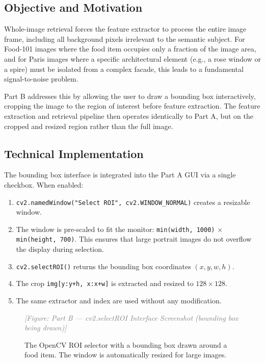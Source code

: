 \documentclass[11pt, a4paper]{article}
\newcommand{\imagebox}[2]{%
  \begin{mdframed}[backgroundcolor=gray!15, linecolor=gray!50, linewidth=1pt]
    \centering
    \vspace{#2}
    \textcolor{gray}{\textit{[Figure: #1]}}
    \vspace{#2}
  \end{mdframed}
}
\begin{document}
\subsection{Objective and Motivation}
Whole-image retrieval forces the feature extractor to process the entire image frame, including all background pixels irrelevant to the semantic subject. For Food-101 images where the food item occupies only a fraction of the image area, and for Paris images where a specific architectural element (e.g., a rose window or a spire) must be isolated from a complex facade, this leads to a fundamental signal-to-noise problem.

Part B addresses this by allowing the user to draw a bounding box interactively, cropping the image to the region of interest before feature extraction. The feature extraction and retrieval pipeline then operates identically to Part A, but on the cropped and resized region rather than the full image.

\subsection{Technical Implementation}
The bounding box interface is integrated into the Part A GUI via a single checkbox. When enabled:
\begin{enumerate}
  \item \texttt{cv2.namedWindow("Select ROI", cv2.WINDOW\_NORMAL)} creates a resizable window.
  \item The window is pre-scaled to fit the monitor: \texttt{min(width, 1000)} × \texttt{min(height, 700)}. This ensures that large portrait images do not overflow the display during selection.
  \item \texttt{cv2.selectROI()} returns the bounding box coordinates $(x, y, w, h)$.
  \item The crop \texttt{img[y:y+h, x:x+w]} is extracted and resized to $128 \times 128$.
  \item The same extractor and index are used without any modification.
\end{enumerate}

\begin{figure}[H]
  \centering
  \imagebox{Part B — cv2.selectROI Interface Screenshot (bounding box being drawn)}{2.5cm}
  \caption{The OpenCV ROI selector with a bounding box drawn around a food item. The window is automatically resized for large images.}
  \label{fig:roi_interface}
\end{figure}
\end{document}

